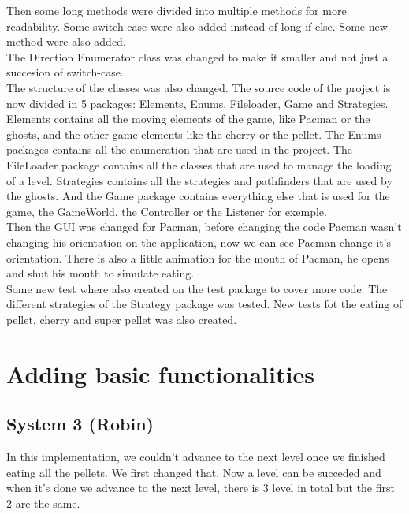 \documentclass[]{article}
\begin{document}
Then some long methods were divided into multiple methods for more readability. Some switch-case were also added instead of long if-else. Some new method were also added.
\\

The Direction Enumerator class was changed to make it smaller and not just a succesion of switch-case. 
\\

The structure of the classes was also changed. The source code of the project is now divided in 5 packages: Elements, Enums, Fileloader, Game and Strategies. Elements contains all the moving elements of the game, like Pacman or the ghosts, and the other game elements like the cherry or the pellet. The Enums packages contains all the enumeration that are used in the project. The FileLoader package contains all the classes that are used to manage the loading of a level. Strategies contains all the strategies and pathfinders that are used by the ghosts. And the Game package contains everything else that is used for the game, the GameWorld, the Controller or the Listener for exemple.
\\

Then the GUI was changed for Pacman, before changing the code Pacman wasn't changing his orientation on the application, now we can see Pacman change it's orientation. There is also a little animation for the mouth of Pacman, he opens and shut his mouth to simulate eating. 
\\

Some new test where also created on the test package to cover more code. The different strategies of the Strategy package was tested. New tests fot the eating of pellet, cherry and super pellet was also created.
\\




\newpage
\section{Adding basic functionalities}

\subsection{System 3 (Robin)}

In this implementation, we couldn't advance to the next level once we finished eating all the pellets.  We first changed that. Now a level can be succeded and when it's done we advance to the next level, there is 3 level in total but the first 2 are the same.
\\
\end{document}
